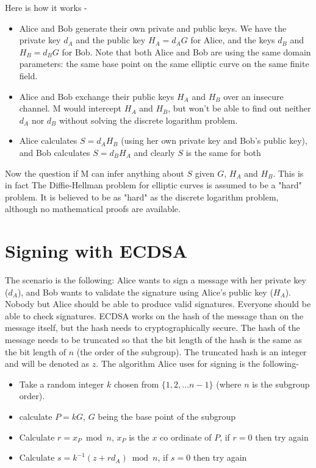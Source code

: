 \documentclass[12pt,letterpaper]{article}
\begin{document}
Here is how it works -
\begin{itemize}
    \item Alice and Bob generate their own private and public keys. We have the private key $d_A$ and the public key $H_A=d_AG$ for Alice, and the keys $d_B$  and $H_B=d_BG$ for Bob. Note that both Alice and Bob are using the same domain parameters: the same base point on the same elliptic curve on the same finite field.
    \item Alice and Bob exchange their public keys $H_A$  and $H_B$ over an insecure channel. M would intercept $H_A$ and $H_B$, but won't be able to find out neither $d_A$ nor $d_B$ without solving the discrete logarithm problem.
    \item Alice calculates $S=d_AH_B$ (using her own private key and Bob's public key), and Bob calculates $S=d_BH_A$ and clearly $S$ is the same for both
\end{itemize}
Now the question if M can infer anything about $S$ given $G$, $H_A$ and $H_B$. This is in fact The Diffie-Hellman problem for elliptic curves is assumed to be a "hard" problem. It is believed to be as "hard" as the discrete logarithm problem, although no mathematical proofs are available.
\section{Signing with ECDSA}
The scenario is the following: Alice wants to sign a message with her private key ($d_A$), and Bob wants to validate the signature using Alice's public key ($H_A$). Nobody but Alice should be able to produce valid signatures. Everyone should be able to check signatures.
ECDSA works on the hash of the message than on the message itself, but the hash needs to cryptographically secure. The hash of the message needs to be truncated so that the bit length of the hash is the same as the bit length of $n$ (the order of the subgroup). The truncated hash is an integer and will be denoted as $z$. 
The algorithm Alice uses for signing is the following- 
\begin{itemize}
    \item Take a random integer $k$ chosen from $\{1,2,\dots n-1\}$ (where $n$ is the subgroup order).
    \item calculate $P=kG$, $G$ being the base point of the subgroup
    \item Calculate $r = x_P \bmod{n}$, $x_P$ is the $x$ co ordinate of $P$, if $r=0$ then try again
    \item Calculate $s = k^{-1} (z + rd_A) \bmod{n}$, if $s=0$ then try again
\end{itemize}
\end{document}
